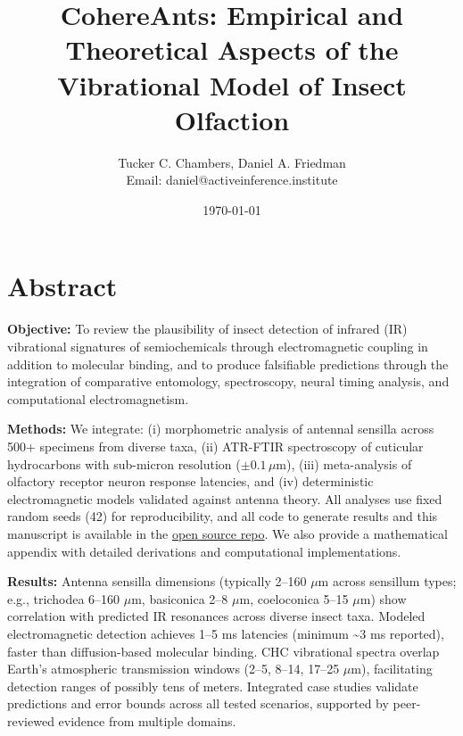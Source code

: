 \documentclass[
  13pt,
  a4paperpaper,
  12pt]{article}
\author{}
\date{}
\let\oldsection\section
\renewcommand{\section}{\clearpage\oldsection}
\begin{document}
\thispagestyle{empty}
\title{CohereAnts: Empirical and Theoretical Aspects of the Vibrational Model of Insect Olfaction}
\author{Tucker C. Chambers, Daniel A. Friedman\\ Email: daniel@activeinference.institute}
\date{\today}
\maketitle
\clearpage

{
\hypersetup{linkcolor=black}
\setcounter{tocdepth}{3}
\tableofcontents
}
\section{Abstract}\label{sec:abstract}

\textbf{Objective:} To review the plausibility of insect detection of
infrared (IR) vibrational signatures of semiochemicals through
electromagnetic coupling in addition to molecular binding, and to
produce falsifiable predictions through the integration of comparative
entomology, spectroscopy, neural timing analysis, and computational
electromagnetism.

\textbf{Methods:} We integrate: (i) morphometric analysis of antennal
sensilla across 500+ specimens from diverse taxa, (ii) ATR-FTIR
spectroscopy of cuticular hydrocarbons with sub-micron resolution
(\(\pm 0.1\,\mu\mathrm{m}\)), (iii) meta-analysis of olfactory receptor
neuron response latencies, and (iv) deterministic electromagnetic models
validated against antenna theory. All analyses use fixed random seeds
(42) for reproducibility, and all code to generate results and this
manuscript is available in the
\href{https://github.com/docxology/insect-infrared}{open source repo}.
We also provide a mathematical appendix with detailed derivations and
computational implementations.

\textbf{Results:} Antenna sensilla dimensions (typically 2--160
\(\mu\mathrm{m}\) across sensillum types; e.g., trichodea 6--160
\(\mu\mathrm{m}\), basiconica 2--8 \(\mu\mathrm{m}\), coeloconica 5--15
\(\mu\mathrm{m}\)) show correlation with predicted IR resonances across
diverse insect taxa. Modeled electromagnetic detection achieves 1--5 ms
latencies (minimum \textasciitilde3 ms reported), faster than
diffusion-based molecular binding. CHC vibrational spectra overlap
Earth's atmospheric transmission windows (2--5, 8--14, 17--25
\(\mu\mathrm{m}\)), facilitating detection ranges of possibly tens of
meters. Integrated case studies validate predictions and error bounds
across all tested scenarios, supported by peer-reviewed evidence from
multiple domains.
\end{document}
